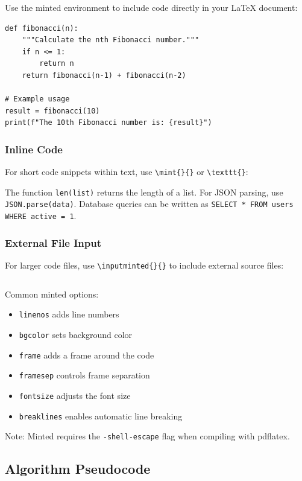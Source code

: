 Use the minted environment to include code directly in your LaTeX document:

\begin{verbatim}
def fibonacci(n):
    """Calculate the nth Fibonacci number."""
    if n <= 1:
        return n
    return fibonacci(n-1) + fibonacci(n-2)

# Example usage
result = fibonacci(10)
print(f"The 10th Fibonacci number is: {result}")
\end{verbatim}

\subsubsection{Inline Code}

For short code snippets within text, use \verb+\mint{}{}+ or \verb+\texttt{}+:

The function \texttt{len(list)} returns the length of a list.
For JSON parsing, use \texttt{JSON.parse(data)}.
Database queries can be written as \verb|SELECT * FROM users WHERE active = 1|.

\subsubsection{External File Input}

For larger code files, use \verb+\inputminted{}{}+ to include external source files:

\inputminted[linenos,bgcolor=lightgray,frame=lines,framesep=2mm]{javascript}{content/scripts/example.js}

Common minted options:
\begin{itemize}
    \item \verb+linenos+ adds line numbers
    \item \verb+bgcolor+ sets background color
    \item \verb+frame+ adds a frame around the code
    \item \verb+framesep+ controls frame separation
    \item \verb+fontsize+ adjusts the font size
    \item \verb+breaklines+ enables automatic line breaking
\end{itemize}

Note: Minted requires the \verb+-shell-escape+ flag when compiling with pdflatex.

\subsection{Algorithm Pseudocode}

